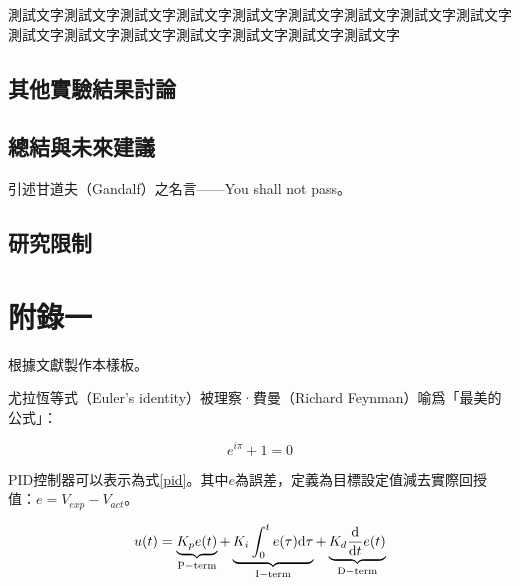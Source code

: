 \documentclass[12pt,a4paper,oneside]{book}
\begin{document}
測試文字測試文字測試文字測試文字測試文字測試文字測試文字測試文字測試文字測試文字測試文字測試文字測試文字測試文字測試文字測試文字

\section{其他實驗結果討論}

\section{總結與未來建議}

引述甘道夫（Gandalf）之名言——You shall not pass。

\section{研究限制}


\clearpage
{}
{}



\NFUAppendix
\clearpage
\chapter{附錄一}
\label{appendix}

根據文獻\cite{nfu2021}製作本樣板。

\vspace{1.5cm}

尤拉恆等式（Euler's identity）被理察·費曼（Richard Feynman）喻爲「最美的公式」：
\begin{Large}
\begin{equation}
    e^{i \pi} + 1 = 0 \label{euler-identity}
\end{equation}
\end{Large}

\vspace{1.5cm}

PID控制器可以表示為式\eqref{pid}。其中$e$為誤差，定義為目標設定值減去實際回授值：$e=V_{exp}-V_{act}$。

\begin{equation}
    u(t) = \underbrace{K_p e(t)}_{\rm P-term}
         + \underbrace{K_i \int_{0}^{t} e(\tau)\mathrm{d}\tau}_{\rm I-term}
         + \underbrace{K_d \frac{\mathrm{d}}{\mathrm{d}t} e(t)}_{\rm D-term}
    \label{pid}
\end{equation}
\end{document}
